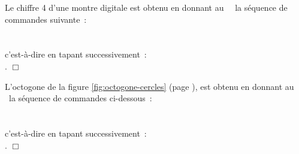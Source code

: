 \begin{corrige}{
Le chiffre 4 d'une montre digitale est
obtenu en donnant au \robot\ \robotCbN\ la séquence de commandes suivante~:\\
\hspace*{2ex}{\idt av();\ av();\ pqtd();\ pqtd();\ av()}\\
\hspace*{2ex}{\idt pqtd();\ av();\ pqtd();\ av()}\\
c'est-à-dire en tapant \hbox{successivement~:}\\
\hspace*{2ex}  \touche{$+$} \touche{$+$}  \touche{$+$}  \touche{$+$} .
$\Box$}\end{corrige}

\begin{corrige}{
L'octogone de la figure \ref{fig:octogone-cercles} (page \pageref{fig:octogone-cercles}), 
est obtenu en donnant au \robot\ la séquence de commandes ci-dessous~:\\
\hspace*{2ex}{\idt av();\ phtd();\ av();\ phtd();\ av();\ phtd();\ av();\ phtd()}\\
\hspace*{2ex}{\idt av();\ phtd();\ av();\ phtd();\ av();\ phtd();\ av()}\\
c'est-à-dire en tapant \hbox{successivement~:}\\
\hspace*{2ex}      
      
  .
$\Box$}\end{corrige}

